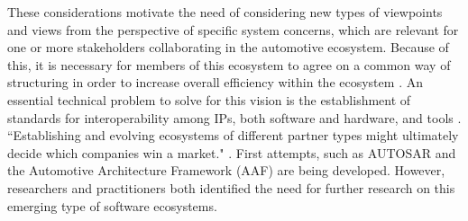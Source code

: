 These considerations motivate the need of considering new types of viewpoints and views from the perspective of specific system concerns, which are relevant for one or more stakeholders collaborating in the automotive ecosystem. Because of this, it is necessary for members of this ecosystem to agree on a common way of structuring in order to increase overall efficiency within the ecosystem \cite{Patrizio2016AAF_Chalmers,Broy2009AAF_TUM,Broy:2006:CAS:1134285.1134292}. An essential technical problem to solve for this vision is the establishment of standards for interoperability among IPs, both software and hardware, and tools \cite{Broy:2006:CAS:1134285.1134292}. ``Establishing and evolving ecosystems of different partner types might ultimately decide which companies win a market." \cite{Bosch2016Ecosystem}. First attempts, such as AUTOSAR \cite{acm2008autosar} and the Automotive Architecture Framework (AAF) \cite{Patrizio2016AAF_Chalmers,Broy2009AAF_TUM} are being developed. However, researchers and practitioners both identified the need for further research on this emerging type of software ecosystems.

